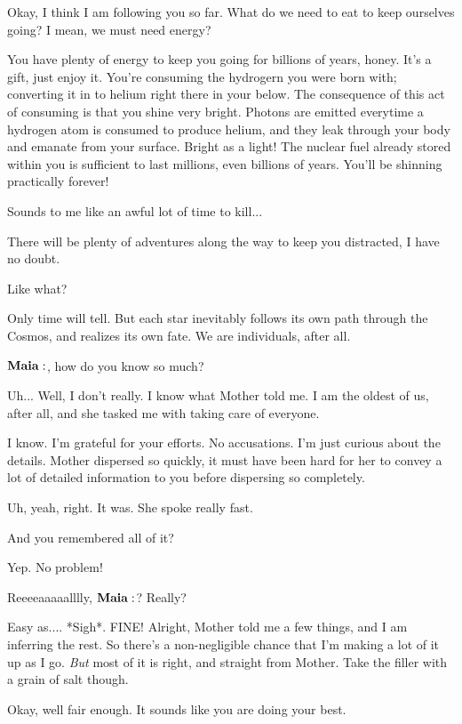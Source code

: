\documentclass[main.tex]{subfiles}
\begin{document}
\Alcyone Okay, I think I am following you so far.  What do we need to eat to keep ourselves going?  I mean, we must need energy?

\Maia You have plenty of energy to keep you going for billions of years, honey.  It's a gift, just enjoy it.  You're consuming the hydrogern you were born with; converting it in to helium right there in your below.  The consequence of this act of consuming is that you shine very bright.  Photons are emitted everytime a hydrogen atom is consumed to produce helium, and they leak through your body and emanate from your surface.  Bright as a light!  The nuclear fuel already stored within you is sufficient to last millions, even billions of years.  You'll be shinning practically forever!

\Celaeno Sounds to me like an awful lot of time to kill...

\Maia There will be plenty of adventures along the way to keep you distracted, I have no doubt.

\Sterope  Like what?  

\Maia Only time will tell.  But each star inevitably follows its own path through the Cosmos, and realizes its own fate.  We are individuals, after all. 

\Sterope $\Maia$, how do you know so much?

\Maia Uh... Well, I don't really. I know what Mother told me.  I am the oldest of us, after all, and she tasked me with taking care of everyone.  

\Sterope I know.  I'm grateful for your efforts.  No accusations.  I'm just curious about the details.  Mother dispersed so quickly, it must have been hard for her to convey a lot of detailed information to you before dispersing so completely.

\Maia Uh, yeah, right.  It was.  She spoke really fast.

\Sterope And you remembered all of it?

\Maia Yep.  No problem!  

\Sterope Reeeeaaaaalllly, $\Maia$?  Really?

\Maia Easy as.... *Sigh*.  FINE!  Alright, Mother told me a few things, and I am inferring the rest.  So there's a non-negligible chance that I'm making a lot of it up as I go.  \textit{But} most of it is right, and straight from Mother.  Take the filler with a grain of salt though.  

\Sterope Okay, well fair enough.  It sounds like you are doing your best.
\end{document}
